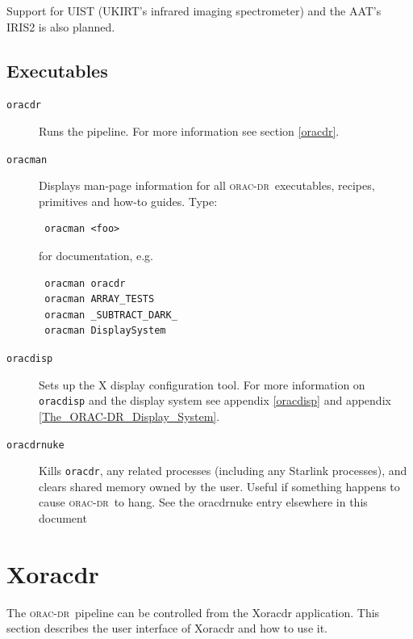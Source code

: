 \documentclass[twoside,11pt]{article}
\newcommand{\xlabel}[1]{}
\renewcommand{\_}{\texttt{\symbol{95}}}
\newcommand{\oracdr}{\textsc{orac-dr}}
\begin{document}
Support for UIST (UKIRT's infrared imaging spectrometer) and the
AAT's IRIS2 is also planned.

\subsection*{Executables\label{ORAC-DR_Components_Executables}}
\begin{description}
\item[\texttt{oracdr}] \mbox{}

Runs the pipeline. For more information see section \ref{oracdr}.

\item[\texttt{oracman}] \mbox{}

Displays man-page information for all \oracdr\ executables, recipes,
primitives and how-to guides. Type:

\begin{verbatim}
 oracman <foo>
\end{verbatim}


for documentation, e.g.

\begin{verbatim}
 oracman oracdr
 oracman ARRAY_TESTS
 oracman _SUBTRACT_DARK_
 oracman DisplaySystem
\end{verbatim}
\item[\texttt{oracdisp}] \mbox{}

Sets up the X display configuration tool. For more information on
\texttt{oracdisp} and the display system see appendix \ref{oracdisp} and appendix \ref{The_ORAC-DR_Display_System}.

\item[\texttt{oracdr\_nuke}] \mbox{}

Kills \texttt{oracdr}, any related processes (including any Starlink
processes), and clears shared memory owned by the user. Useful if
something happens to cause \oracdr\ to hang. See the \textsf{oracdr\_nuke}
 entry elsewhere in this document

\end{description}

\section{Xoracdr\label{Xoracdr}\xlabel{xoracdr}}

The \oracdr\ pipeline can be controlled from the Xoracdr
application. This section describes the user interface of Xoracdr and how
to use it.
\end{document}
